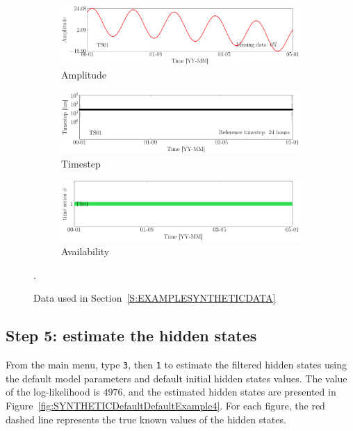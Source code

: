 \begin{figure}[h!]
\centering
\begin{subfigure}{\linewidth}
\includegraphics[width=0.9\linewidth]{./docfigs/Example_SYNTHETIC/raw/ALL_AMPLITUDES.pdf} 
\caption{Amplitude}
\end{subfigure}
\begin{subfigure}{\linewidth}
\includegraphics[width=0.9\linewidth]{./docfigs/Example_SYNTHETIC/raw/ALL_TIMESTEPS.pdf}
\caption{Timestep}
\end{subfigure}
\begin{subfigure}{\linewidth}
\includegraphics[width=0.9\linewidth]{./docfigs/Example_SYNTHETIC/raw/AVAILABILITY.pdf}
\caption{Availability}
\end{subfigure}
\caption{Data used in Section~\ref{S:EXAMPLESYNTHETICDATA}}.
\label{fig:DataSummaryRaw4}
\end{figure}


\subsection{Step 5: estimate the hidden states}

From the main menu, type  \colorbox{light-gray}{\lstinline[basicstyle = \mlttfamily \small, backgroundcolor = \color{light-gray}]!3!}, then \colorbox{light-gray}{\lstinline[basicstyle = \mlttfamily \small, backgroundcolor = \color{light-gray}]!1!} to estimate the filtered hidden states using the default model parameters and default initial hidden states values.
The value of the log-likelihood is $4976$, and the estimated hidden states are presented in Figure~\ref{fig:SYNTHETICDefaultDefaultExample4}.
For each figure, the red dashed line represents the true known values of the hidden states.

